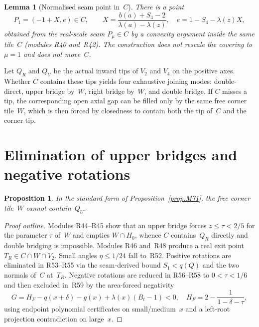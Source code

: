 \documentclass[11pt,reqno]{amsart}
\newtheorem{proposition}[theorem]{Proposition}
\newtheorem{lemma}[theorem]{Lemma}
\theoremstyle{definition}
\begin{document}
\begin{lemma}[Normalised seam point in~$C$]\label{lem:M81}
There is a point
\begin{equation}\label{eq:M11}
P_1=(-1+X,e)\in C,\qquad
X=\frac{b(a)+S_4-2}{\lambda(a)-\lambda(z)},\quad
e=1-S_4-\lambda(z)X,
\end{equation}
obtained from the real-scale seam $P_\mu\in C$ by a convexity argument inside
the same tile~$C$ (modules R40 and~R42).  The construction does not rescale the
covering to $\mu=1$ and does not move~$C$.
\end{lemma}



Let $Q_R$ and $Q_U$ be the actual inward tips of $V_2$ and $V_4$ on the positive
axes.  Whether $C$ contains these tips yields four exhaustive joining modes:
double-direct, upper bridge by~$W$, right bridge by~$W$, and double bridge.
If $C$ misses a tip, the corresponding open axial gap can be filled only by the
same free corner tile~$W$, which is then forced by closedness to contain both
the tip of~$C$ and the corner tip.



\section{Elimination of upper bridges and negative rotations}\label{sec:M9}

\begin{proposition}\label{prop:M91}
In the standard form of Proposition~\ref{prop:M71}, the free corner tile~$W$
cannot contain~$Q_U$.
\end{proposition}

\begin{proof}[Proof outline]
Modules R44--R45 show that an upper bridge forces $z\le\tau<2/5$ for the
parameter $\tau$ of~$W$ and empties $W\cap H_0$, whence $C$ contains~$Q_R$
directly and double bridging is impossible.  Modules R46 and~R48 produce a
real exit point $T_R\in C\cap W\cap V_2$.  Small angles $\eta\le 1/24$ fall to~R52.
Positive rotations are eliminated in R53--R55 via the seam-derived bound
$S_1<q(Q)$ and the two normals of~$C$ at~$T_R$.  Negative rotations are reduced
in R56--R58 to $0<\tau<1/6$ and then excluded in~R59 by the area-forced
negativity
\begin{equation}\label{eq:M12}
G=H_F-q(x+\delta)-g(x)+\lambda(x)(B_t-1)<0,
\quad H_F=2-\frac1{1-\delta-\tau},
\end{equation}
using endpoint polynomial certificates on small/medium~$x$ and a left-root
projection contradiction on large~$x$.
\end{proof}
\end{document}
